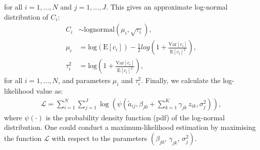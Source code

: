 \documentclass[12pt]{article}
\begin{document}
for all $i=1,...,N$ and $j=1,...,J.$ 
This gives an approximate log-normal distribution of $C_i$:
\begin{align}
    C_i 
    & \sim \text{lognormal} (\mu_i,\sqrt{\tau_i}), \, \\
    \mu_i 
    & = \text{log}(\text{E}[c_i])-\frac{1}{2}log(1+\frac{\text{Var}[c_i]}{\text{E}[c_i]^2}), \\
    \tau_i^2 
    & = \text{log}(1+\frac{\text{Var}[c_i]}{\text{E}[c_i]^2}),
\end{align}
for all $i=1,\ldots,N$, and parameters $\mu_i$ and $\tau_i^2$.
Finally, we calculate the log-likelihood value as:
\begin{align}
    \mathcal{L} = \sum_{i=1}^N \sum_{j=1}^J \log \left( \psi \left( \tilde{a}_{ij}, \beta_{j0}+\sum_{k=1}^K \gamma_{jk} \, z_{ik},
    \sigma_{j}^2 \right) \right),
\end{align}
where $\psi(\cdot)$ is the probability density function (pdf) of 
the log-normal distribution. 
One could conduct a maximum-likelihood estimation by maximising the function $\mathcal{L}$ with respect to the parameters $(\beta_{j0}, \, \gamma_{jk}, \,\sigma_j^2)$. 
\end{document}
